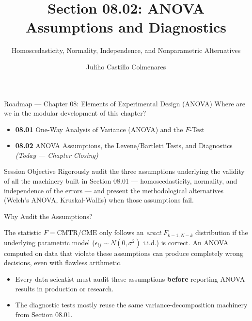 \documentclass[10pt, aspectratio=169]{beamer}
\title[ANOVA Assumptions]{Section 08.02: ANOVA Assumptions and Diagnostics}
\subtitle{Homoscedasticity, Normality, Independence, and Nonparametric Alternatives}
\author[J. Castillo Colmenares]{Juliho Castillo Colmenares}
\institute{Tecnológico de Monterrey}
\date{\vspace{-1.5cm}}
\begin{document}
\begin{frame}[plain]
  \titlepage
\end{frame}

\begin{frame}{Roadmap --- Chapter 08: Elements of Experimental Design (ANOVA)}
  \footnotesize
  Where are we in the modular development of this chapter? \pause
  \begin{itemize}\itemsep=0.08em
    \item \textbf{08.01} One-Way Analysis of Variance (ANOVA) and the $F$-Test \pause
    \item \textbf{08.02} ANOVA Assumptions, the Levene/Bartlett Tests, and Diagnostics \emph{(Today --- Chapter Closing)}
  \end{itemize}
  \vspace{-0.05cm}
  \begin{block}{Session Objective}
    Rigorously audit the three assumptions underlying the validity of all the machinery built in Section 08.01 --- homoscedasticity, normality, and independence of the errors --- and present the methodological alternatives (Welch's ANOVA, Kruskal-Wallis) when those assumptions fail.
  \end{block}
\end{frame}

\begin{frame}{Why Audit the Assumptions?}
  \footnotesize
  \begin{motivacion}
    The statistic $F=\text{CMTR}/\text{CME}$ only follows an \emph{exact} $F_{k-1,N-k}$ distribution if the underlying parametric model ($\epsilon_{ij}\sim N(0,\sigma^2)$ i.i.d.) is correct. An ANOVA computed on data that violate these assumptions can produce completely wrong decisions, even with flawless arithmetic.
  \end{motivacion}

  \vspace{0.15cm}
  \pause
  \begin{itemize}\itemsep=0.1cm
    \item Every data scientist must audit these assumptions \textbf{before} reporting ANOVA results in production or research. \pause
    \item The diagnostic tests mostly reuse the same variance-decomposition machinery from Section 08.01.
  \end{itemize}
\end{frame}
\end{document}
